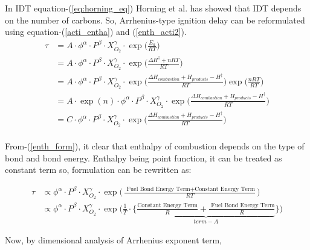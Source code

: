 \documentclass[preprint,12pt]{elsarticle}
\begin{document}
		\newpage
		
		In IDT equation-(\ref{eq:horning_eq}) Horning et al. has showed that IDT depends on the number of carbons. So, Arrhenius-type ignition delay can be reformulated using equation-(\ref{acti_entha}) and (\ref{enth_acti2}). 
		\begin{equation}
		\begin{aligned}
		\tau &= A \cdot \phi^\alpha  \cdot P^\beta  \cdot X_{O_2}^\gamma  \cdot \exp\bigg(\frac{E_a}{RT}\bigg) \\
		&= A \cdot \phi^\alpha \cdot P^\beta  \cdot X_{O_2}^\gamma  \cdot \exp\bigg(\frac{\Delta H^{\ddagger} + nRT}{RT}\bigg) \\
		&= A \cdot \phi^\alpha  \cdot P^\beta  \cdot X_{O_2}^\gamma  \cdot \exp\bigg(\frac{\Delta H_{combustion} + H_{products} - H^{\ddagger}}{RT}\bigg) \exp\bigg(\frac{nRT}{RT}\bigg) \\
		&= A \cdot \exp(n) \cdot \phi^\alpha  \cdot P^\beta  \cdot X_{O_2}^\gamma   \cdot \exp\bigg(\frac{\Delta H_{combustion} + H_{products} - H^{\ddagger}}{RT}\bigg) \\
		&= C \cdot \phi^\alpha  \cdot P^\beta  \cdot X_{O_2}^\gamma  \cdot \exp\bigg(\frac{\Delta H_{combustion} + H_{products} - H^{\ddagger}}{RT}\bigg) \\
		\end{aligned}
		\end{equation}
		
		From-(\ref{enth_form}), it clear that enthalpy of combustion depends on the type of bond and bond energy. Enthalpy being point function, it can be treated as constant term so, formulation can be rewritten as:
		
		\begin{equation}\label{eq:formulation1}
		\begin{aligned}		
		\tau &\propto  \phi^\alpha \cdot P^\beta  \cdot X_{O_2}^\gamma   \cdot \exp \bigg(\frac{\text{ Fuel Bond Energy Term} + \text{Constant Energy Term}}{RT}\bigg) \\
		&\propto  \phi^\alpha \cdot P^\beta  \cdot X_{O_2}^\gamma   \cdot \exp \bigg( \frac{1}{T} \cdot \bigg\{\underbrace{\frac{\text{Constant Energy Term}}{R} + \frac{\text{ Fuel Bond Energy Term}}{R} }_{term-A}\bigg\} \bigg)	
		\end{aligned}
		\end{equation}
				
		Now, by dimensional analysis of Arrhenius exponent term,
		
\end{document}
